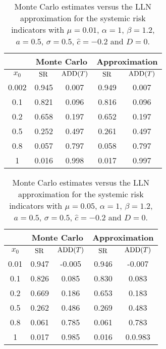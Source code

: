\documentclass[10pt]{article}
\theoremstyle{plain}
\theoremstyle{definition}
\newcommand{\<}{\langle}
\renewcommand{\>}{\rangle}
\renewcommand{\(}{\left(}
\renewcommand{\)}{\right)}
\renewcommand{\[}{\left[}
\renewcommand{\]}{\right]}
\begin{document}
\begin{table}[H]
\caption{Monte Carlo estimates versus the LLN approximation for the systemic risk indicators with $\mu=0.01$, $\alpha = 1$, $\beta=1.2$, $a=0.5$, $\sigma=0.5$, $\hat c=-0.2$ and $D=0$.}\label{tab1}
\begin{center}
\begin{tabular}{c|c|c||c|c}
&\multicolumn{2}{c}{Monte Carlo}&\multicolumn{2}{c}{Approximation}\\\hline\hline $x_0$&$\text{\rm
SR}$&$\text{\rm ADD}(T)$&$\text{\rm SR}$&$\text{\rm ADD}(T)$\\\hline\hline
0.002&0.945&0.007&0.949&0.007\\ 0.1&0.821&0.096&0.816&0.096\\ 0.2&0.658&0.197&0.652&0.197\\
0.5&0.252&0.497&0.261&0.497\\ 0.8&0.057&0.797&0.058&0.797\\ 1&0.016&0.998&0.017&0.997\\
\end{tabular}
\end{center}
\end{table}
\begin{table}
\caption{Monte Carlo estimates versus the LLN approximation for the systemic risk indicators with $\mu=0.05$, $\alpha = 1$, $\beta=1.2$, $a=0.5$, $\sigma=0.5$, $\hat c=-0.2$ and $D=0$.}\label{tab2}
\begin{center}
\begin{tabular}{c|c|c||c|c}
&\multicolumn{2}{c}{Monte Carlo}&\multicolumn{2}{c}{Approximation}\\\hline\hline $x_0$&$\text{\rm
SR}$&$\text{\rm ADD}(T)$&$\text{\rm SR}$&$\text{\rm ADD}(T)$\\\hline\hline
0.01&0.947&-0.005&0.946&-0.007\\ 0.1&0.826&0.085&0.830&0.083\\ 0.2&0.669&0.186&0.653&0.183\\
0.5&0.262&0.486&0.269&0.483\\ 0.8&0.061&0.785&0.061&0.783\\ 1&0.017&0.985&0.016&0.0.983\\
\end{tabular}
\end{center}
\end{table}
\end{document}

